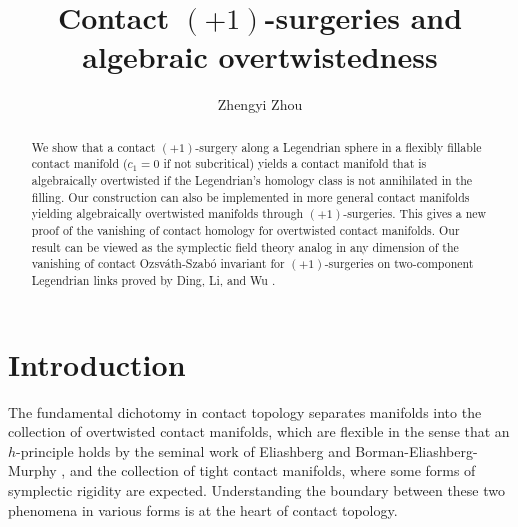 \documentclass[reqno,11pt]{amsart}
\title{Contact $(+1)$-surgeries and algebraic overtwistedness}
\author{Zhengyi Zhou}
\numberwithin{equation}{section}
\begin{document}
	\maketitle
\begin{abstract}
We show that a contact $(+1)$-surgery along a Legendrian sphere in a flexibly fillable contact manifold ($c_1=0$ if not subcritical) yields a contact manifold that is algebraically overtwisted if the Legendrian's homology class is not annihilated in the filling. Our construction can also be implemented in more general contact manifolds yielding algebraically overtwisted manifolds through $(+1)$-surgeries. This gives a new proof of the vanishing of contact homology for overtwisted contact manifolds. Our result can be viewed as the symplectic field theory analog in any dimension of the vanishing of contact Ozsv\'ath-Szab\'o invariant for $(+1)$-surgeries on two-component Legendrian links proved by Ding, Li, and Wu \cite{DLW}. 
\end{abstract}
\section{Introduction}
The fundamental dichotomy in contact topology separates manifolds into the collection of overtwisted contact manifolds, which are flexible in the sense that an $h$-principle holds by the seminal work of Eliashberg \cite{zbMATH04121041} and Borman-Eliashberg-Murphy \cite{zbMATH06567662}, and the collection of tight contact manifolds, where some forms of symplectic rigidity are expected. Understanding the boundary between these two phenomena in various forms is at the heart of contact topology.
\end{document}

